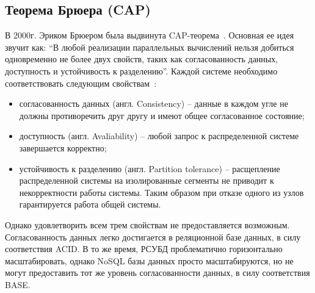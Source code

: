 \subsection{Теорема Брюера (CAP)}
В 2000г. Эриком Брюером была выдвинута CAP-теорема~\cite{cap,cap_new}. 
Основная ее идея звучит как: ``В любой реализации параллельных вычислений нельзя добиться одновременно не более двух свойств, таких как согласованность данных, доступность и устойчивость к разделению''.
Каждой системе необходимо соответствовать следующим свойствам~\cite{morecap}:
\begin{itemize}[label=---]
    \item согласованность данных (англ. Consistency) -- данные в каждом угле не должны противоречить друг другу и имеют общее согласованное состояние;
    \item доступность (англ. Avaliability) -- любой запрос к распределенной системе завершается корректно;
    \item устойчивость к разделению (англ. Partition tolerance) -- расщепление распределенной системы на изолированные сегменты не приводит к некорректности работы системы. Таким образом при отказе одного из узлов гарантируется работа общей системы.
\end{itemize}

Однако удовлетворить всем трем свойствам не предоставляется возможным.
Согласованность данных легко достигается в реляционной базе данных, в силу соответствия ACID.
В то же время, РСУБД проблематично горизонтально масштабировать,
однако NoSQL базы данных просто масштабируются,
но не могут предоставить тот же уровень согласованности данных,
в силу соответствия BASE.

